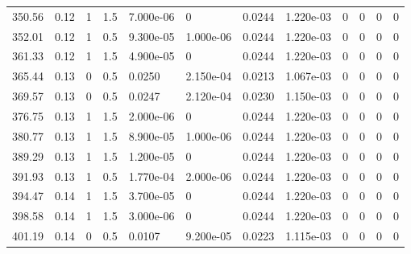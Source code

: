 \documentclass[preview]{standalone}
\begin{document}
{{{\begin{tabular}{L{1.2cm}C{1.2cm} C{0.3cm}C{0.5cm} C{1.4cm}C{1.4cm} C{1.4cm}C{1.4cm} C{1.6cm}C{1.6cm} C{1.6cm}C{1.6cm}}
  350.56  &  0.12  & 1     & 1.5 &  7.000e-06  & 0  &  0.0244&   1.220e-03& 0 & 0   &  0 & 0  \\ 
  352.01  &  0.12  & 1     & 0.5 &  9.300e-05  & 1.000e-06  &  0.0244&   1.220e-03& 0 & 0   &  0 & 0  \\ 
  361.33  &  0.12  & 1     & 1.5 &  4.900e-05  & 0  &  0.0244&   1.220e-03& 0 & 0   &  0 & 0  \\ 
  365.44  &  0.13  & 0     & 0.5 &  0.0250  & 2.150e-04  &  0.0213&   1.067e-03& 0 & 0   &  0 & 0  \\ 
  369.57  &  0.13  & 0     & 0.5 &  0.0247  & 2.120e-04  &  0.0230&   1.150e-03& 0 & 0   &  0 & 0  \\ 
  376.75  &  0.13  & 1     & 1.5 &  2.000e-06  & 0  &  0.0244&   1.220e-03& 0 & 0   &  0 & 0  \\ 
  380.77  &  0.13  & 1     & 1.5 &  8.900e-05  & 1.000e-06  &  0.0244&   1.220e-03& 0 & 0   &  0 & 0  \\ 
  389.29  &  0.13  & 1     & 1.5 &  1.200e-05  & 0  &  0.0244&   1.220e-03& 0 & 0   &  0 & 0  \\ 
  391.93  &  0.13  & 1     & 0.5 &  1.770e-04  & 2.000e-06  &  0.0244&   1.220e-03& 0 & 0   &  0 & 0  \\ 
  394.47  &  0.14  & 1     & 1.5 &  3.700e-05  & 0  &  0.0244&   1.220e-03& 0 & 0   &  0 & 0  \\ 
  398.58  &  0.14  & 1     & 1.5 &  3.000e-06  & 0  &  0.0244&   1.220e-03& 0 & 0   &  0 & 0  \\ 
  401.19  &  0.14  & 0     & 0.5 &  0.0107  & 9.200e-05  &  0.0223&   1.115e-03& 0 & 0   &  0 & 0  \\ 
\hline 
\end{tabular} 

}}}
\end{document}
